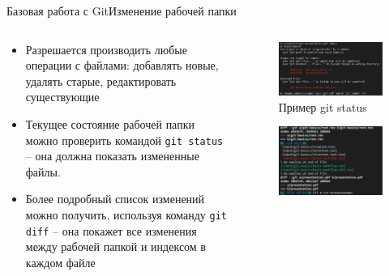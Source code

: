 \begin{frame}{Базовая работа с Git}{Изменение рабочей папки}
    \begin{columns}
        \begin{column}{0.6\textwidth}
            \begin{itemize}
                \item
                      Разрешается производить любые операции с файлами: добавлять новые, удалять старые, редактировать существующие
                \item
                      Текущее состояние рабочей папки можно проверить командой \lstinline[style=BashInputStyle]{git status} -- она должна показать измененные файлы.
                \item
                      Более подробный список изменений можно получить, используя команду \lstinline[style=BashInputStyle]{git diff} -- она покажет все изменения между рабочей папкой и индексом в каждом файле
            \end{itemize}
        \end{column}
        \begin{column}{0.4\textwidth}
            \begin{figure}
                \centering
                \includegraphics[width=\textwidth]{images/git-status-example.png}
                \caption{Пример git status}
            \end{figure}
            \begin{figure}
                \centering
                \includegraphics[width=\textwidth]{images/git-diff-example.png}

\end{figure}
\end{column}
\end{columns}
\end{frame}
